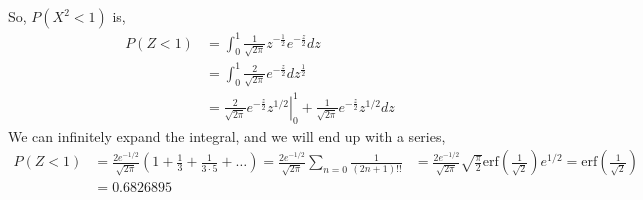 \documentclass[letterpaper]{article}
\begin{document}
\begin{enumerate}[(a)]
	So, $P(X^2 < 1)$ is,
    \begin{align*}
	P(Z < 1) & = \int_0^1 \frac{1}{\sqrt{2\pi}} z^{-\frac{1}{2}} e^{-\frac{z}{2}} dz \\
    & = \int_0^1 \frac{2}{\sqrt{2\pi}} e^{-\frac{z}{2}} dz^{\frac{1}{2}} \\
    & = \left. \frac{2}{\sqrt{2\pi}} e^{-\frac{z}{2}} z^{1/2} \right|^1_0 + \frac{1}{\sqrt{2\pi}} e^{-\frac{z}{2}} z^{1/2} dz
    \end{align*}
    We can infinitely expand the integral, and we will end up with a series,
    \begin{align*}
    P(Z<1) &= \frac{2e^{-1/2}}{\sqrt{2\pi}} (1 + \frac{1}{3} + \frac{1}{3\cdot5} + \dots) = \frac{2e^{-1/2}}{\sqrt{2\pi}} \sum_{n=0} \frac{1}{(2n+1)!!}
    & = \frac{2e^{-1/2}}{\sqrt{2\pi}} \sqrt{\frac{\pi}{2}} \text{erf}\left(\frac{1}{\sqrt{2}}\right) e^{1/2} = \text{erf}\left(\frac{1}{\sqrt{2}}\right) \\
    & = 0.6826895
    \end{align*}
	
        \end{enumerate}
\end{document}
